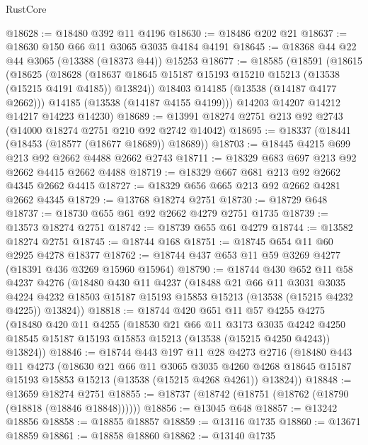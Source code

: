 \begin{lexlean}{RustCore}
\begin{coremodule}
@18628 := @18480 @392 @11 @4196
@18630 := @18486 @202 @21
@18637 := @18630 @150 @66 @11 @3065 @3035 @4184 @4191
@18645 := @18368 @44 @22 @44 @3065 (@13388 (@18373 @44)) @15253
@18677 := @18585
    (@18591
      (@18615
        (@18625
          (@18628 (@18637 @18645 @15187 @15193 @15210 @15213 (@13538 (@15215 @4191 @4185)) @13824))
          @18403
          @14185
          (@13538 (@14187 @4177 @2662)))
        @14185
        (@13538 (@14187 @4155 @4199)))
      @14203
      @14207
      @14212
      @14217
      @14223
      @14230)
@18689 := @13991 @18274 @2751 @213 @92 @2743 (@14000 @18274 @2751 @210 @92 @2742 @14042)
@18695 := @18337 (@18441 (@18453 (@18577 (@18677 @18689)) @18689))
@18703 := @18445 @4215 @699 @213 @92 @2662 @4488 @2662 @2743
@18711 := @18329 @683 @697 @213 @92 @2662 @4415 @2662 @4488
@18719 := @18329 @667 @681 @213 @92 @2662 @4345 @2662 @4415
@18727 := @18329 @656 @665 @213 @92 @2662 @4281 @2662 @4345
@18729 := @13768 @18274 @2751
@18730 := @18729 @648
@18737 := @18730 @655 @61 @92 @2662 @4279 @2751 @1735
@18739 := @13573 @18274 @2751
@18742 := @18739 @655 @61 @4279
@18744 := @13582 @18274 @2751
@18745 := @18744 @168
@18751 := @18745 @654 @11 @60 @2925 @4278 @18377
@18762 := @18744 @437 @653 @11 @59 @3269 @4277 (@18391 @436 @3269 @15960 @15964)
@18790 := @18744
    @430
    @652
    @11
    @58
    @4237
    @4276
    (@18480
      @430
      @11
      @4237
      (@18488
        @21
        @66
        @11
        @3031
        @3035
        @4224
        @4232
        @18503
        @15187
        @15193
        @15853
        @15213
        (@13538 (@15215 @4232 @4225))
        @13824))
@18818 := @18744
    @420
    @651
    @11
    @57
    @4255
    @4275
    (@18480
      @420
      @11
      @4255
      (@18530
        @21
        @66
        @11
        @3173
        @3035
        @4242
        @4250
        @18545
        @15187
        @15193
        @15853
        @15213
        (@13538 (@15215 @4250 @4243))
        @13824))
@18846 := @18744
    @443
    @197
    @11
    @28
    @4273
    @2716
    (@18480
      @443
      @11
      @4273
      (@18630
        @21
        @66
        @11
        @3065
        @3035
        @4260
        @4268
        @18645
        @15187
        @15193
        @15853
        @15213
        (@13538 (@15215 @4268 @4261))
        @13824))
@18848 := @13659 @18274 @2751
@18855 := @18737 (@18742 (@18751 (@18762 (@18790 (@18818 (@18846 @18848))))))
@18856 := @13045 @648
@18857 := @13242 @18856
@18858 := @18855 @18857
@18859 := @13116 @1735
@18860 := @13671 @18859
@18861 := @18858 @18860
@18862 := @13140 @1735

\end{coremodule}
\end{lexlean}
